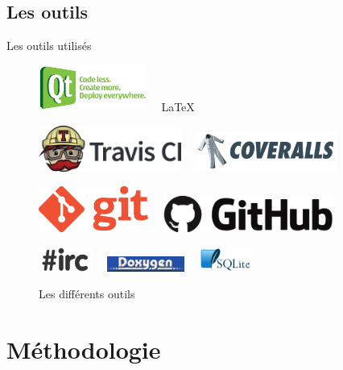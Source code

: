 \documentclass{beamer}
\begin{document}
\subsection{Les outils}
\begin{frame}{Les outils utilisés}
	\begin{figure}[H]
		\centering
	\includegraphics[height=1.5cm]{logos/qt.png}~~
	\Huge \LaTeX

	\includegraphics[height=1.5cm]{logos/travis.png}~~
	\includegraphics[height=1.3cm]{logos/coveralls.png}

	\includegraphics[height=1.5cm]{logos/git.png}~~
	\includegraphics[height=1.2cm]{logos/github.png}

	\includegraphics[height=0.8cm]{logos/irc.png}~~
	\includegraphics[height=0.5cm]{logos/doxygen.png}~~ 
	\includegraphics[height=0.8cm]{logos/sqlite.png}
	\caption{Les différents outils}
\end{figure}
	
\end{frame}
\section{Méthodologie}
\end{document}
